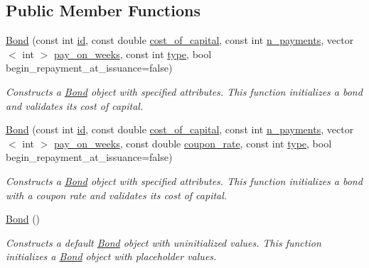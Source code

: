 \subsection*{Public Member Functions}
\begin{DoxyCompactItemize}
\item 
\mbox{\hyperlink{classBond_ac2ed54d795433c9c6a4236629553fb83}{Bond}} (const int \mbox{\hyperlink{classBond_a7f75bcafbc16676ad6dbafbf40afae4a}{id}}, const double \mbox{\hyperlink{classBond_ad98df7d28b398e620286f95ee085439b}{cost\+\_\+of\+\_\+capital}}, const int \mbox{\hyperlink{classBond_a4a227b6de2eeada118d82ab1633b1db8}{n\+\_\+payments}}, vector$<$ int $>$ \mbox{\hyperlink{classBond_ae8dd46fcbf95c993460ffe4ea1f52739}{pay\+\_\+on\+\_\+weeks}}, const int \mbox{\hyperlink{classBond_a48da24878beedd71cbaa990cea860667}{type}}, bool begin\+\_\+repayment\+\_\+at\+\_\+issuance=false)
\begin{DoxyCompactList}\small\item\em Constructs a \mbox{\hyperlink{classBond}{Bond}} object with specified attributes. This function initializes a bond and validates its cost of capital. \end{DoxyCompactList}\item 
\mbox{\hyperlink{classBond_a8758b7ef325a779eeee87eb91947ce58}{Bond}} (const int \mbox{\hyperlink{classBond_a7f75bcafbc16676ad6dbafbf40afae4a}{id}}, const double \mbox{\hyperlink{classBond_ad98df7d28b398e620286f95ee085439b}{cost\+\_\+of\+\_\+capital}}, const int \mbox{\hyperlink{classBond_a4a227b6de2eeada118d82ab1633b1db8}{n\+\_\+payments}}, vector$<$ int $>$ \mbox{\hyperlink{classBond_ae8dd46fcbf95c993460ffe4ea1f52739}{pay\+\_\+on\+\_\+weeks}}, const double \mbox{\hyperlink{classBond_a5f66785534e24caa43d9f730130a6463}{coupon\+\_\+rate}}, const int \mbox{\hyperlink{classBond_a48da24878beedd71cbaa990cea860667}{type}}, bool begin\+\_\+repayment\+\_\+at\+\_\+issuance=false)
\begin{DoxyCompactList}\small\item\em Constructs a \mbox{\hyperlink{classBond}{Bond}} object with specified attributes. This function initializes a bond with a coupon rate and validates its cost of capital. \end{DoxyCompactList}\item 
\mbox{\hyperlink{classBond_a5b809c10637a30a2b24ed01609d68711}{Bond}} ()
\begin{DoxyCompactList}\small\item\em Constructs a default \mbox{\hyperlink{classBond}{Bond}} object with uninitialized values. This function initializes a \mbox{\hyperlink{classBond}{Bond}} object with placeholder values. \end{DoxyCompactList}\item 

\end{DoxyCompactItemize}
